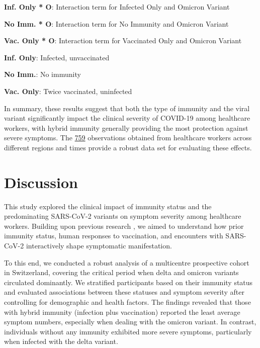\documentclass[11pt]{article}
\begin{document}
\begin{table}[h]
\begin{threeparttable}
\begin{tablenotes}
\item \textbf{Inf. Only * O}: Interaction term for Infected Only and Omicron Variant
\item \textbf{No Imm. * O}: Interaction term for No Immunity and Omicron Variant
\item \textbf{Vac. Only * O}: Interaction term for Vaccinated Only and Omicron Variant
\item \textbf{Inf. Only}: Infected, unvaccinated
\item \textbf{No Imm.}: No immunity
\item \textbf{Vac. Only}: Twice vaccinated, uninfected
\end{tablenotes}
\end{threeparttable}
\end{table}

In summary, these results suggest that both the type of immunity and the viral variant significantly impact the clinical severity of COVID-19 among healthcare workers, with hybrid immunity generally providing the most protection against severe symptoms. The \hyperlink{R0a}{759} observations obtained from healthcare workers across different regions and times provide a robust data set for evaluating these effects.

\section*{Discussion}

This study explored the clinical impact of immunity status and the predominating SARS-CoV-2 variants on symptom severity among healthcare workers. Building upon previous research \cite{Lee2022SARSCoV2VI, Levin2021WaningIH, Weigang2021WithinhostEO, Lavine2021ImmunologicalCG, Jiang2021LastingAA, Reynolds2022ImmuneBB}, we aimed to understand how prior immunity status, human responses to vaccination, and encounters with SARS-CoV-2 interactively shape symptomatic manifestation.

To this end, we conducted a robust analysis of a multicentre prospective cohort in Switzerland, covering the critical period when delta and omicron variants circulated dominantly. We stratified participants based on their immunity status and evaluated associations between these statuses and symptom severity after controlling for demographic and health factors. The findings revealed that those with hybrid immunity (infection plus vaccination) reported the least average symptom numbers, especially when dealing with the omicron variant. In contrast, individuals without any immunity exhibited more severe symptoms, particularly when infected with the delta variant. 
\end{document}
